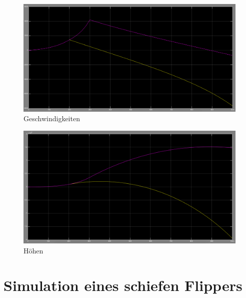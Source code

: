 \documentclass[10pt,a4paper]{article}
\begin{document}
		 		\begin{figure}[H]
	 	 	 	 		\centering
	 	 	 	 		\includegraphics[width=1\textwidth]{../aufgabe1/screens/geschwindigkeiten.png}
	 	 	 	 		\caption{Geschwindigkeiten}
	 	 	 	 	\end{figure}
		 		\begin{figure}[H]
		 	 	 	 		\centering
		 	 	 	 		\includegraphics[width=1\textwidth]{../aufgabe1/screens/hoehen.png}
		 	 	 	 		\caption{Höhen}
		 	 	 	 	\end{figure}
\section{Simulation eines schiefen Flippers}
\end{document}
